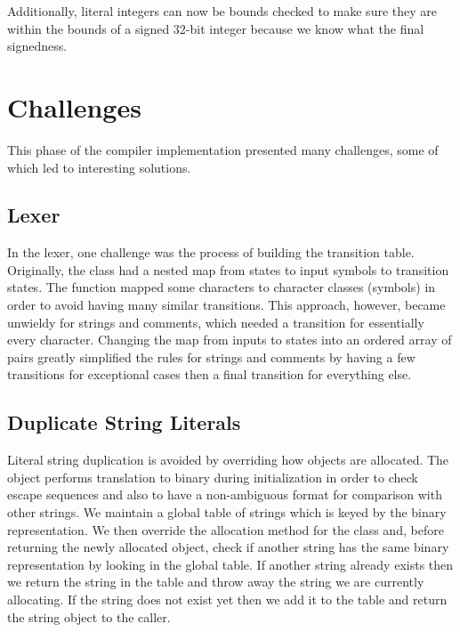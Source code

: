 \documentclass[pdftex,11pt,a4paper]{article}
\begin{document}
Additionally, literal integers can now be bounds checked to make sure
they are within the bounds of a signed 32-bit integer because we know
what the final signedness.


\section{Challenges}

This phase of the compiler implementation presented many
challenges, some of which led to interesting solutions.

\subsection{Lexer}

In the lexer, one challenge was the process of building the transition
table. Originally, the  class had a nested map from states
to input symbols to transition states. The  function
mapped some characters to character classes (symbols) in order to avoid
having many similar transitions. This approach, however, became
unwieldy for strings and comments, which needed a transition for
essentially every character. Changing the map from inputs to states
into an ordered array of  pairs greatly simplified
the rules for strings and comments by having a few transitions for
exceptional cases then a final transition for everything else.


\subsection{Duplicate String Literals}

Literal string duplication is avoided by overriding how
 objects are allocated. The 
object performs translation to binary during initialization in order
to check escape sequences and also to have a non-ambiguous format for
comparison with other strings. We maintain a global table of strings
which is keyed by the binary representation. We then override the
allocation method for the class and, before returning the newly
allocated object, check if another string has the same binary
representation by looking in the global table. If another string
already exists then we return the string in the table and throw away
the string we are currently allocating. If the string does not exist
yet then we add it to the table and return the string object to the
caller.
\end{document}
